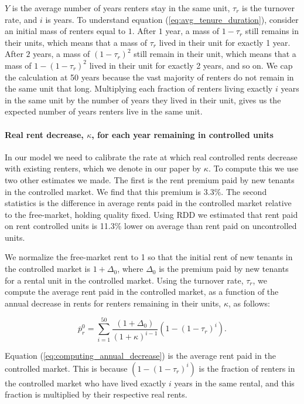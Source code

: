 \documentclass[parskip=full]{article}
\begin{document}
\noindent $Y$ is the average number of years renters stay in the same unit, $\tau_{r}$ is the turnover rate, and $i$ is years. To understand equation (\ref{eq:avg_tenure_duration}), consider an initial mass of renters equal to $1$. After $1$ year, a mass of $1-\tau_{r}$ still remains in their units, which means that a mass of $\tau_{r}$ lived in their unit for exactly 1 year. After $2$ years, a mass of $(1-\tau_{r})^2$ still remain in their unit, which means that a mass of $1-(1-\tau_{r})^2$ lived in their unit for exactly 2 years, and so on. We cap the calculation at 50 years because the vast majority of renters do not remain in the same unit that long. Multiplying each fraction of renters living exactly $i$ years in the same unit by the number of years they lived in their unit, gives us the expected number of years renters live in the same unit.

\paragraph{Real rent decrease, $\kappa$, for each year remaining in controlled units}

In our model we need to calibrate the rate at which real controlled rents decrease  with existing renters, which we denote in our paper by $\kappa$. To compute this we use two other estimates we made. The first is the rent premium paid by new tenants in the controlled market. We find that this premium is 3.3\%. The second statistics is the difference in average rents paid in the controlled market relative to the free-market, holding quality fixed. Using RDD we estimated that rent paid on rent controlled units is 11.3\% lower on average than rent paid on uncontrolled units. 

We normalize the free-market rent to 1 so that the initial rent of new tenants in the controlled market is $1+\Delta_{0}$, where $\Delta_{0}$ is the premium paid by new tenants for a rental unit in the controlled market. Using the turnover rate, $\tau_{r}$, we compute the average rent paid in the controlled market, as a function of the annual decrease in rents for renters remaining in their units, $\kappa$, as follows:

\begin{equation}\label{eq:computing_annual_decrease}
    \overline{p}^{0}_{r}=\sum_{i=1}^{50}\frac{(1+\Delta_{0})}{(1+\kappa)^{i-1}}(1-(1-\tau_{r})^{i}).
\end{equation}

\noindent Equation (\ref{eq:computing_annual_decrease}) is the average rent paid in the controlled market. This is because $(1-(1-\tau_{r})^{i})$ is the fraction of renters in the controlled market who have lived exactly $i$ years in the same rental, and this fraction is multiplied by their respective real rents.
\end{document}
